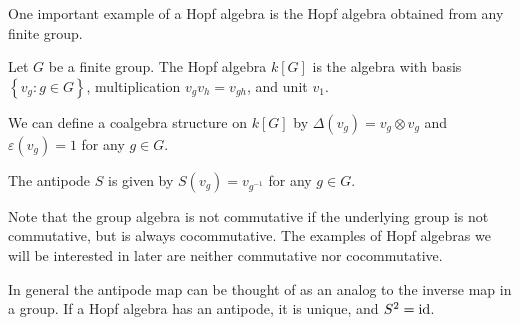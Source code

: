 \begin{example}
    \label{example:groupalgebra}
    One important example of a Hopf algebra is the Hopf algebra obtained from
    any finite group. 

    Let $G$ be a finite group. The Hopf algebra $k[G]$ is the algebra with
    basis $\left\{ v_g: g \in G \right\}$, multiplication $v_g v_h = v_{gh}$,
    and unit $v_1$. 

    We can define a coalgebra structure on $k[G]$ by $\Delta(v_g) = v_g \otimes v_g$
    and $\varepsilon(v_g) = 1$ for any $g \in G$.

    The antipode $S$ is given by $S(v_g) = v_{g^{-1}}$ for any $g \in G$.

    Note that the group algebra is not commutative if the underlying group is
    not commutative, but is always cocommutative. The examples of Hopf
    algebras we will be interested in later are neither commutative nor
    cocommutative. 
\end{example}

In general the antipode map can be thought of as an analog to the inverse map
in a group. If a Hopf algebra has an antipode, it is unique, and $S^2 = \operatorname{id}$.

